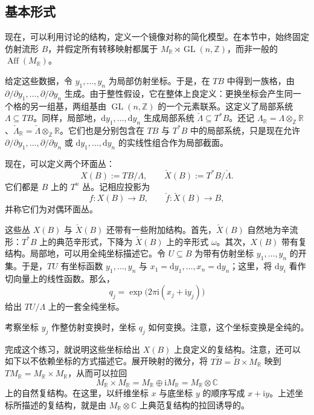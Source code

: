 \subsection{基本形式}\label{sec:6.2.1}

现在，可以利用讨论的结构，定义一个镜像对称的简化模型。在本节中，始终固定仿射流形 $B$，并假定所有转移映射都属于 $M_{\mathbb R}\rtimes\operatorname{GL}(n,\mathbb Z)$，而非一般的 $\operatorname{Aff}(M_{\mathbb R})$。

给定这些数据，令 $y_1,\ldots,y_n$ 为局部仿射坐标。于是，在 $TB$ 中得到一族格，由 $\partial/\partial y_1,\ldots,\partial/\partial y_n$ 生成。由于整性假设，它在整体上良定义：更换坐标会产生同一个格的另一组基，两组基由 $\operatorname{GL}(n,\mathbb Z)$ 的一个元素联系。这定义了局部系统 $\Lambda\subseteq TB$。同样，局部地，$\mathrm dy_1,\ldots,\mathrm dy_n$ 生成局部系统 $\check\Lambda\subseteq T^*B$。还记 $\Lambda_{\mathbb R}=\Lambda\otimes_{\mathbb Z}\mathbb R$、$\check\Lambda_{\mathbb R}=\check\Lambda\otimes_{\mathbb Z}\mathbb R$。它们也是分别包含在 $TB$ 与 $T^*B$ 中的局部系统，只是现在允许 $\partial/\partial y_1,\ldots,\partial/\partial y_n$ 或 $\mathrm dy_1,\ldots,\mathrm dy_n$ 的实线性组合作为局部截面。

现在，可以定义两个环面丛：
\[
X(B):=TB/\Lambda,\qquad
\check X(B):=T^*B/\check\Lambda.
\]
它们都是 $B$ 上的 $T^n$ 丛。记相应投影为
\[
f\colon X(B)\longrightarrow B,
\qquad
\check f\colon\check X(B)\longrightarrow B,
\]
并称它们为对偶环面丛。

这些丛 $X(B)$ 与 $\check X(B)$ 还带有一些附加结构。首先，$\check X(B)$ 自然地为辛流形：$T^*B$ 上的典范辛形式，下降为 $\check X(B)$ 上的辛形式 $\omega$。其次，$X(B)$ 带有复结构。局部地，可以用全纯坐标描述它。令 $U\subseteq B$ 为带有仿射坐标 $y_1,\ldots,y_n$ 的开集。于是，$TU$ 有坐标函数 $y_1,\ldots,y_n$ 与 $x_1=\mathrm dy_1,\ldots,x_n=\mathrm dy_n$；这里，将 $\mathrm dy_i$ 看作切向量上的线性函数。那么，
\[
q_j=\exp\bigl(2\pi\mathrm i(x_j+\mathrm i y_j)\bigr)
\]
给出 $TU/\Lambda$ 上的一套全纯坐标。

\begin{exercise}\label{exer:6.12}
考察坐标 $y_j$ 作整仿射变换时，坐标 $q_j$ 如何变换。注意，这个坐标变换是全纯的。
\end{exercise}

完成这个练习，就说明这些坐标给出 $X(B)$ 上良定义的复结构。注意，还可以如下以不依赖坐标的方式描述它。展开映射的微分，将 $T\widetilde B=\widetilde B\times M_{\mathbb R}$ 映到 $TM_{\mathbb R}=M_{\mathbb R}\times M_{\mathbb R}$，从而可以拉回
\[
M_{\mathbb R}\times M_{\mathbb R}
=M_{\mathbb R}\oplus\mathrm iM_{\mathbb R}
=M_{\mathbb R}\otimes\mathbb C
\]
上的自然复结构。在这里，以纤维坐标 $x$ 与底坐标 $y$ 的顺序写成 $x+\mathrm i y$。上述坐标所描述的复结构，就是由 $M_{\mathbb R}\otimes\mathbb C$ 上典范复结构的拉回诱导的。

